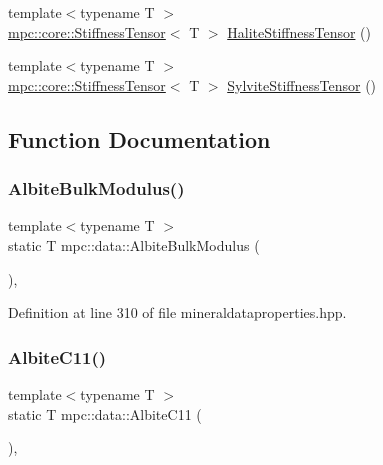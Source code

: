 \begin{DoxyCompactItemize}
\item 
{\footnotesize template$<$typename T $>$ }\\\mbox{\hyperlink{structmpc_1_1core_1_1_stiffness_tensor}{mpc\+::core\+::\+Stiffness\+Tensor}}$<$ T $>$ \mbox{\hyperlink{namespacempc_1_1data_a309b60a4ca36aa931d7b573027abf387}{Halite\+Stiffness\+Tensor}} ()
\item 
{\footnotesize template$<$typename T $>$ }\\\mbox{\hyperlink{structmpc_1_1core_1_1_stiffness_tensor}{mpc\+::core\+::\+Stiffness\+Tensor}}$<$ T $>$ \mbox{\hyperlink{namespacempc_1_1data_ac5a6918a5ed0de859d31ce5bb64d9595}{Sylvite\+Stiffness\+Tensor}} ()
\end{DoxyCompactItemize}


\subsection{Function Documentation}
\mbox{\label{namespacempc_1_1data_a5ebb9d2c3decc84c941dd1f713fb077d}} 
\subsubsection{\texorpdfstring{Albite\+Bulk\+Modulus()}{AlbiteBulkModulus()}}
{\footnotesize\ttfamily template$<$typename T $>$ \\
static T mpc\+::data\+::\+Albite\+Bulk\+Modulus (\begin{DoxyParamCaption}{ }\end{DoxyParamCaption})\hspace{0.3cm}{\ttfamily [inline]}, {\ttfamily [static]}}



Definition at line 310 of file mineraldataproperties.\+hpp.

\mbox{\label{namespacempc_1_1data_a830c8b5582400390734122f8a641bb1e}} 
\subsubsection{\texorpdfstring{Albite\+C11()}{AlbiteC11()}}
{\footnotesize\ttfamily template$<$typename T $>$ \\
static T mpc\+::data\+::\+Albite\+C11 (\begin{DoxyParamCaption}{ }\end{DoxyParamCaption})\hspace{0.3cm}{\ttfamily [inline]}, {\ttfamily [static]}}



